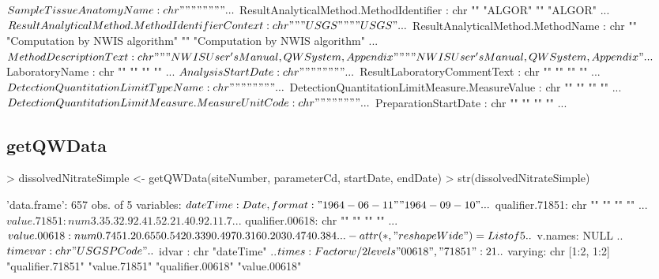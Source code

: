 \documentclass[a4paper,11pt]{article}
\begin{document}
\begin{Schunk}
\begin{Soutput}
 $ SampleTissueAnatomyName                          : chr  "" "" "" "" ...
 $ ResultAnalyticalMethod.MethodIdentifier          : chr  "" "ALGOR" "" "ALGOR" ...
 $ ResultAnalyticalMethod.MethodIdentifierContext   : chr  "" "USGS" "" "USGS" ...
 $ ResultAnalyticalMethod.MethodName                : chr  "" "Computation by NWIS algorithm" "" "Computation by NWIS algorithm" ...
 $ MethodDescriptionText                            : chr  "" "NWIS User's Manual, QW System, Appendix" "" "NWIS User's Manual, QW System, Appendix" ...
 $ LaboratoryName                                   : chr  "" "" "" "" ...
 $ AnalysisStartDate                                : chr  "" "" "" "" ...
 $ ResultLaboratoryCommentText                      : chr  "" "" "" "" ...
 $ DetectionQuantitationLimitTypeName               : chr  "" "" "" "" ...
 $ DetectionQuantitationLimitMeasure.MeasureValue   : chr  "" "" "" "" ...
 $ DetectionQuantitationLimitMeasure.MeasureUnitCode: chr  "" "" "" "" ...
 $ PreparationStartDate                             : chr  "" "" "" "" ...
\end{Soutput}
\end{Schunk}

\subsection{getQWData}
\begin{Schunk}
\begin{Sinput}
> dissolvedNitrateSimple <- getQWData(siteNumber, parameterCd, startDate, endDate)
> str(dissolvedNitrateSimple)
\end{Sinput}
\begin{Soutput}
'data.frame':	657 obs. of  5 variables:
 $ dateTime       : Date, format: "1964-06-11" "1964-09-10" ...
 $ qualifier.71851: chr  "" "" "" "" ...
 $ value.71851    : num  3.3 5.3 2.9 2.4 1.5 2.2 1.4 0.9 2.1 1.7 ...
 $ qualifier.00618: chr  "" "" "" "" ...
 $ value.00618    : num  0.745 1.2 0.655 0.542 0.339 0.497 0.316 0.203 0.474 0.384 ...
 - attr(*, "reshapeWide")=List of 5
  ..$ v.names: NULL
  ..$ timevar: chr "USGSPCode"
  ..$ idvar  : chr "dateTime"
  ..$ times  : Factor w/ 2 levels "00618","71851": 2 1
  ..$ varying: chr [1:2, 1:2] "qualifier.71851" "value.71851" "qualifier.00618" "value.00618"
\end{Soutput}
\end{Schunk}

\end{document}
